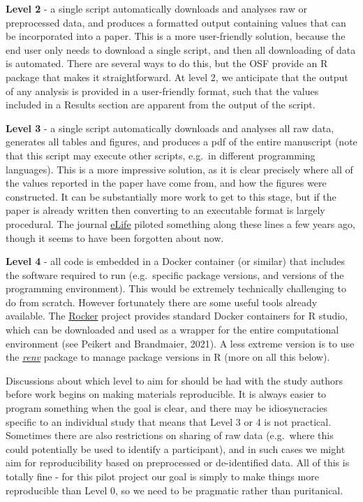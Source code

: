 \documentclass[
]{article}
\begin{document}
\textbf{Level 2} - a single script automatically downloads and analyses raw or preprocessed data, and produces a formatted output containing values that can be incorporated into a paper. This is a more user-friendly solution, because the end user only needs to download a single script, and then all downloading of data is automated. There are several ways to do this, but the OSF provide an R package that makes it straightforward. At level 2, we anticipate that the output of any analysis is provided in a user-friendly format, such that the values included in a Results section are apparent from the output of the script.

\textbf{Level 3} - a single script automatically downloads and analyses all raw data, generates all tables and figures, and produces a pdf of the entire manuscript (note that this script may execute other scripts, e.g.~in different programming languages). This is a more impressive solution, as it is clear precisely where all of the values reported in the paper have come from, and how the figures were constructed. It can be substantially more work to get to this stage, but if the paper is already written then converting to an executable format is largely procedural. The journal \href{https://elifesciences.org/}{eLife} piloted something along these lines a few years ago, though it seems to have been forgotten about now.

\textbf{Level 4} - all code is embedded in a Docker container (or similar) that includes the software required to run (e.g.~specific package versions, and versions of the programming environment). This would be extremely technically challenging to do from scratch. However fortunately there are some useful tools already available. The \href{https://rocker-project.org/}{Rocker} project provides standard Docker containers for R studio, which can be downloaded and used as a wrapper for the entire computational environment (see Peikert and Brandmaier, 2021). A less extreme version is to use the \href{https://rstudio.github.io/renv/articles/renv.html}{\emph{renv}} package to manage package versions in R (more on all this below).

Discussions about which level to aim for should be had with the study authors before work begins on making materials reproducible. It is always easier to program something when the goal is clear, and there may be idiosyncracies specific to an individual study that means that Level 3 or 4 is not practical. Sometimes there are also restrictions on sharing of raw data (e.g.~where this could potentially be used to identify a participant), and in such cases we might aim for reproducibility based on preprocessed or de-identified data. All of this is totally fine - for this pilot project our goal is simply to make things more reproducible than Level 0, so we need to be pragmatic rather than puritanical.
\end{document}

